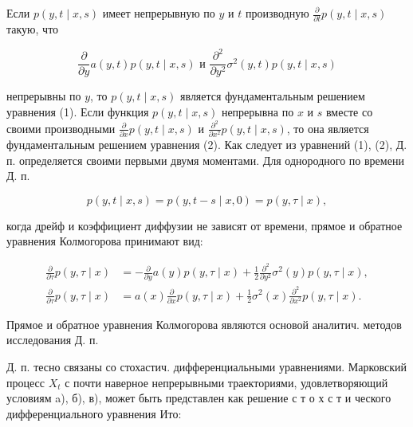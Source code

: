 \documentclass[10pt]{article}
\begin{document}
Если $p(y, t \mid x, s)$ имеет непрерывную по $y$ и $t$ производную $\frac{\partial}{\partial t} p(y, t \mid x, s)$ такую, что



\[

\frac{\partial}{\partial y} a(y, t) p(y, t \mid x, s) \text { и } \frac{\partial^{2}}{\partial y^{2}} \sigma^{2}(y, t) p(y, t \mid x, s)

\]



непрерывны по $y$, то $p(y, t \mid x, s)$ является фундаментальным решением уравнения (1). Если функция $p(y, t \mid x, s)$ непрерывна по $x$ и $s$ вместе со своими производными $\frac{\partial}{\partial x} p(y, t \mid x, s)$ и $\frac{\partial^{2}}{\partial x^{2}} p(y, t \mid x, s)$, то она является фундаментальным решением уравнения (2). Как следует из уравнений (1), (2), Д. п. определяется своими первыми двумя моментами. Для однородного по времени Д. п.



\[

p(y, t \mid x, s)=p(y, t-s \mid x, 0)=p(y, \tau \mid x),

\]



когда дрейф и коэффициент диффузии не зависят от времени, прямое и обратное уравнения Колмогорова принимают вид:



\[

\begin{aligned}

\frac{\partial}{\partial \tau} p(y, \tau \mid x) & =-\frac{\partial}{\partial y} a(y) p(y, \tau \mid x)+\frac{1}{2} \frac{\partial^{2}}{\partial y^{2}} \sigma^{2}(y) p(y, \tau \mid x), \\

\frac{\partial}{\partial \tau} p(y, \tau \mid x) & =a(x) \frac{\partial}{\partial x} p(y, \tau \mid x)+\frac{1}{2} \sigma^{2}(x) \frac{\partial^{2}}{\partial x^{2}} p(y, \tau \mid x) .

\end{aligned}

\]



Прямое и обратное уравнения Колмогорова являются основой аналитич. методов исследования Д. п.



Д. п. тесно связаны со стохастич. дифференциальными уравнениями. Марковский процесс $X_{t}$ с почти наверное непрерывными траекториями, удовлетворяющий условиям a), б), в), может быть представлен как решение с т о х с т и ческого дифференциального уравнения Ито:
\end{document}
